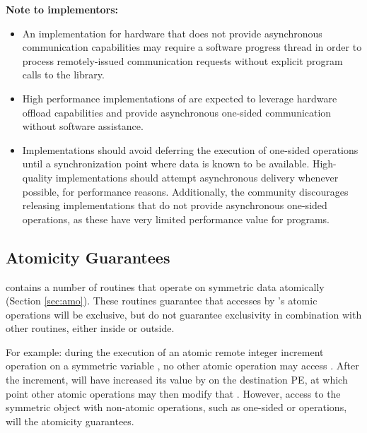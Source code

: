 \textbf{Note to implementors:}
\begin{itemize}
  \item An \openshmem implementation for hardware that does not provide
      asynchronous communication capabilities may require a software progress
      thread in order to process remotely-issued communication requests without
      explicit program calls to the \openshmem library.  
  \item High performance implementations of \openshmem are expected to leverage
      hardware offload capabilities and provide asynchronous one-sided
      communication without software assistance.
  \item Implementations should avoid deferring the execution of one-sided
      operations until a synchronization point where data is known to be
      available. High-quality implementations should attempt asynchronous delivery
      whenever possible, for performance reasons. Additionally, the \openshmem
      community discourages releasing \openshmem implementations that do not
      provide asynchronous one-sided operations, as these have very limited
      performance value for \openshmem programs.
\end{itemize}

\subsection{Atomicity Guarantees}\label{sec:amo_guarantees}

\openshmem contains a number of routines that operate on symmetric data
atomically (Section \ref{sec:amo}).  These routines guarantee that accesses by
\openshmem's atomic operations will be exclusive, but do not guarantee
exclusivity in combination with other routines, either inside \openshmem or
outside.

For example: during the execution of an atomic remote integer increment
operation on a symmetric variable , no other \openshmem atomic operation
may access .  After the increment,  will have increased its value
by  on the destination \ac{PE}, at which point other atomic operations
may then modify that .  However, access to the symmetric object 
with non-atomic operations, such as one-sided  or  operations,
will  the atomicity guarantees.
